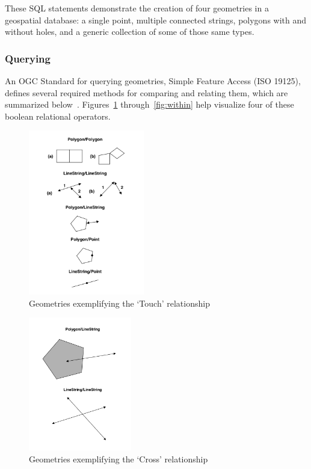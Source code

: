 These SQL statements demonstrate the creation of four geometries in a geospatial database: a single point, multiple connected strings, polygons with and without holes, and a generic collection of some of those same types.

\subsubsection{Querying}
An OGC Standard for querying geometries, Simple Feature Access (ISO 19125), defines several required methods for comparing and relating them, which are summarized below~\cite{}. Figures~\ref{fig:touches} through~\ref{fig:within} help visualize four of these boolean relational operators.

\begin{figure}
    \centering

    \includegraphics[width=0.45\textwidth]{figures/touches.png}
    
    \caption{Geometries exemplifying the `Touch' relationship}
    \label{fig:touches}
    
\end{figure}

\begin{figure}
    \centering

    \includegraphics[width=0.4\textwidth]{figures/crosses.png}
    
    \caption{Geometries exemplifying the `Cross' relationship}
    \label{fig:crosses}
    
\end{figure}

